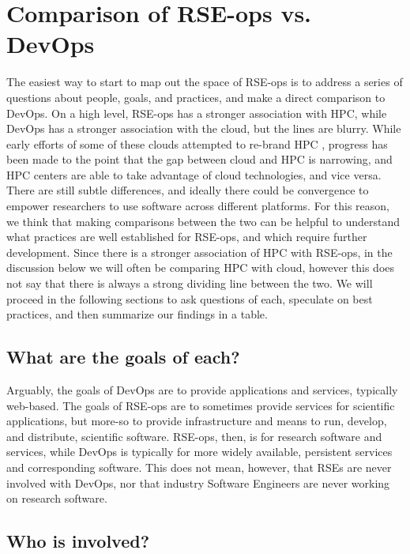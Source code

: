 \section{Comparison of RSE-ops vs. DevOps}

The easiest way to start to map out the space of RSE-ops is to address a series of questions about people, goals, and practices, and make a direct comparison to DevOps. On a high level, RSE-ops has a stronger association with HPC, while DevOps has a stronger association with the cloud, but the lines are blurry. While early efforts of some of these clouds attempted to re-brand HPC \cite{google-hpc}, progress has been made to the point that the gap between cloud and HPC is narrowing, and HPC centers are able to take advantage of cloud technologies, and vice versa. There are still subtle differences, and ideally there could be convergence to empower researchers to use software across different platforms. 
For this reason, we think that making comparisons between the two can be helpful to understand what practices are well established for RSE-ops, and which require further development. Since there is a stronger association of HPC with RSE-ops, in the discussion below we will often be comparing HPC with cloud, however this does not say that there is always a strong dividing line between the two. We will proceed in the following sections to ask questions of each, speculate on best practices, and then summarize our findings in a table.

\subsection{What are the goals of each?}

Arguably, the goals of DevOps are to provide applications and services, typically web-based. The goals of RSE-ops are to sometimes provide services for scientific applications, but more-so to provide infrastructure and means to run, develop, and distribute, scientific software. RSE-ops, then, is for research software and services, while DevOps is typically for more widely available, persistent services and corresponding software. This does not mean, however, that RSEs are never involved with DevOps, nor that industry Software Engineers are never working on research software.

\subsection{Who is involved?}

